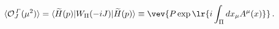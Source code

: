 \begin{equation}
\langle{\cal O}_J^{\,\mit\Gamma} (\mu^2) \rangle
=
\langle \widetilde{H}(p) |
W_{\scriptstyle\Pi} ( - i J )
| \widetilde{H}(p)  \rangle
\equiv\vev{P\exp\lr{i\int_{\scriptstyle\Pi} dx_\mu A^\mu(x)}}
\, .
\label{O-W}
\end{equation}

